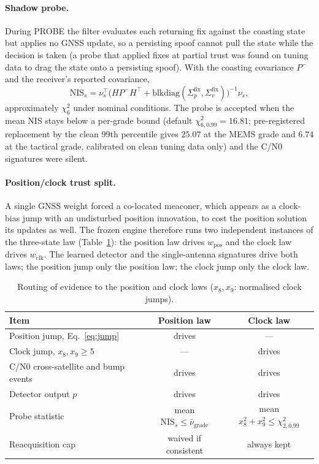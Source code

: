 \documentclass[12pt,a4paper]{article}
\begin{document}
\paragraph{Shadow probe.}
During PROBE the filter evaluates each returning fix against the coasting state but applies no GNSS update, so a persisting spoof cannot pull the state while the decision is taken (a probe that applied fixes at partial trust was found on tuning data to drag the state onto a persisting spoof). With the coasting covariance $P^{-}$ and the receiver's reported covariance,
\begin{equation}
\mathrm{NIS}_{s} = \nu_s^{\top}\big(HP^{-}H^{\top}+\mathrm{blkdiag}(\Sigma_p^{\mathrm{fix}},\Sigma_v^{\mathrm{fix}})\big)^{-1}\nu_s,
\label{eq:shadownis}
\end{equation}
approximately $\chi^2_6$ under nominal conditions. The probe is accepted when the mean NIS stays below a per-grade bound (default $\chi^2_{6,0.99}=16.81$; pre-registered replacement by the clean 99th percentile gives $25.07$ at the MEMS grade and $6.74$ at the tactical grade, calibrated on clean tuning data only) and the C/N0 signatures were silent.

\paragraph{Position/clock trust split.}
A single GNSS weight forced a co-located meaconer, which appears as a clock-bias jump with an undisturbed position innovation, to cost the position solution its updates as well. The frozen engine therefore runs two independent instances of the three-state law (Table~\ref{tab:trustsplit}): the position law drives $w_{\mathrm{pos}}$ and the clock law drives $w_{\mathrm{clk}}$. The learned detector and the single-antenna signatures drive both laws; the position jump only the position law; the clock jump only the clock law.

\begin{table}[ht]
\centering
\caption{Routing of evidence to the position and clock laws ($x_8,x_9$: normalised clock jumps).}
\label{tab:trustsplit}
\small
\begin{tabular}{lcc}
\toprule
Item & Position law & Clock law \\
\midrule
Position jump, Eq.~\eqref{eq:jump} & drives & --- \\
Clock jump, $x_8,x_9\ge5$ & --- & drives \\
C/N0 cross-satellite and bump events & drives & drives \\
Detector output $p$ & drives & drives \\
Probe statistic & mean $\mathrm{NIS}_s\le\bar\nu_{\mathrm{grade}}$ & mean $x_8^2+x_9^2\le\chi^2_{2,0.99}$ \\
Reacquisition cap & waived if consistent & always kept \\
\bottomrule
\end{tabular}
\end{table}
\end{document}

